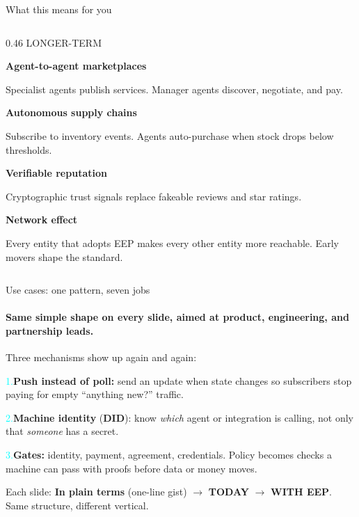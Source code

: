 \documentclass[aspectratio=169,10pt]{beamer}
\begin{document}
\begin{frame}[shrink=8]{What this means for you}
\begin{columns}[T]
\begin{column}{0.46\textwidth}
{\footnotesize\color{accent} LONGER-TERM}\par
\vspace{4pt}
{\footnotesize\color{txtm}%
\textbf{Agent-to-agent marketplaces}\par
{\color{slate} Specialist agents publish services. Manager agents discover, negotiate, and pay.}\par
\vspace{10pt}
\textbf{Autonomous supply chains}\par
{\color{slate} Subscribe to inventory events. Agents auto-purchase when stock drops below thresholds.}\par
\vspace{10pt}
\textbf{Verifiable reputation}\par
{\color{slate} Cryptographic trust signals replace fakeable reviews and star ratings.}\par
\vspace{10pt}
\textbf{Network effect}\par
{\color{slate} Every entity that adopts EEP makes every other entity more reachable. Early movers shape the standard.}%
}
\end{column}
\end{columns}
\end{frame}




\begin{frame}{Use cases: one pattern, seven jobs}
\framesubtitle{Same simple shape on every slide, aimed at product, engineering, and partnership leads.}

\vspace{0.1cm}
{\small\color{txtm}%
Three mechanisms show up again and again:\par
\vspace{4pt}
\textcolor{cyan}{1.}\;\textbf{Push instead of poll:} send an update when state changes so subscribers stop paying for empty ``anything new?'' traffic.\par
\vspace{3pt}
\textcolor{cyan}{2.}\;\textbf{Machine identity} (\textbf{DID}): know \emph{which} agent or integration is calling, not only that \emph{someone} has a secret.\par
\vspace{3pt}
\textcolor{cyan}{3.}\;\textbf{Gates:} identity, payment, agreement, credentials. Policy becomes checks a machine can pass with proofs before data or money moves.\par
}
\vspace{6pt}
{\footnotesize\color{slate} Each slide: \textbf{In plain terms} (one-line gist) $\rightarrow$ \textbf{TODAY} $\rightarrow$ \textbf{WITH EEP}. Same structure, different vertical.}
\end{frame}
\end{document}
